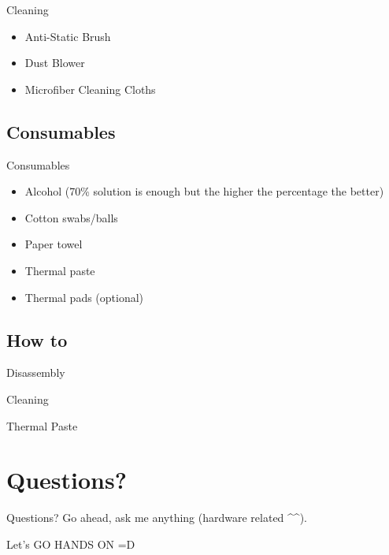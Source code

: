 \documentclass{beamer}
\begin{document}
\begin{frame}{Cleaning}
    \begin{itemize}
        \item Anti-Static Brush
        \item Dust Blower
        \item Microfiber Cleaning Cloths
    \end{itemize}
\end{frame}

\subsection{Consumables}

\begin{frame}{Consumables}
    \begin{itemize}
      \item Alcohol (70\% solution is enough but the higher the percentage the better)
      \item Cotton swabs/balls
      \item Paper towel
      \item Thermal paste
      \item Thermal pads (optional)
    \end{itemize}
\end{frame}

\subsection{How to}

\begin{frame}{Disassembly}
\end{frame}

\begin{frame}{Cleaning}
\end{frame}

\begin{frame}{Thermal Paste}
\end{frame}

\section{Questions?}

\begin{frame}{Questions?}
    Go ahead, ask me anything (hardware related \textasciicircum \textasciicircum).
\end{frame}

\begin{frame}{Let's GO}
    HANDS ON =D
\end{frame}
\end{document}
